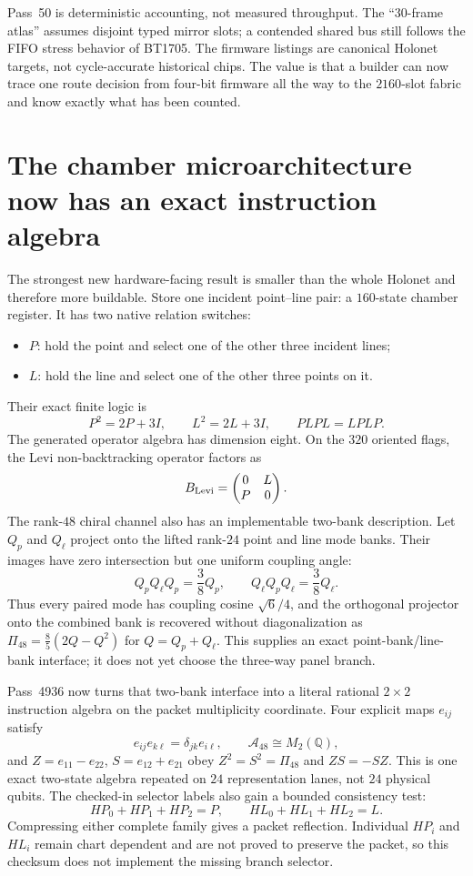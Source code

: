 \documentclass[11pt]{article}
\begin{document}
\begin{honestbox}
Pass~50 is deterministic accounting, not measured throughput.  The
``30-frame atlas'' assumes disjoint typed mirror slots; a contended shared bus
still follows the FIFO stress behavior of BT1705.  The firmware listings are
canonical Holonet targets, not cycle-accurate historical chips.  The value is
that a builder can now trace one route decision from four-bit firmware all the
way to the \(2160\)-slot fabric and know exactly what has been counted.
\end{honestbox}

\section{The chamber microarchitecture now has an exact instruction algebra}

The strongest new hardware-facing result is smaller than the whole Holonet and therefore
more buildable. Store one incident point--line pair: a $160$-state chamber register. It has
two native relation switches:

\begin{itemize}[leftmargin=1.4em]
\item $P$: hold the point and select one of the other three incident lines;
\item $L$: hold the line and select one of the other three points on it.
\end{itemize}

Their exact finite logic is
\[
P^2=2P+3I,\qquad L^2=2L+3I,\qquad PLPL=LPLP.
\]
The generated operator algebra has dimension eight. On the $320$ oriented flags, the Levi
non-backtracking operator factors as
\[
B_{\rm Levi}=\begin{pmatrix}0&L\\P&0\end{pmatrix}.
\]
The rank-$48$ chiral channel also has an implementable two-bank description. Let
$Q_p$ and $Q_\ell$ project onto the lifted rank-$24$ point and line mode banks.
Their images have zero intersection but one uniform coupling angle:
\[
 Q_pQ_\ell Q_p=\frac38Q_p,\qquad
 Q_\ell Q_pQ_\ell=\frac38Q_\ell.
\]
Thus every paired mode has coupling cosine $\sqrt6/4$, and the orthogonal projector
onto the combined bank is recovered without diagonalization as
$\Pi_{48}=\frac85(2Q-Q^2)$ for $Q=Q_p+Q_\ell$. This supplies an exact
point-bank/line-bank interface; it does not yet choose the three-way panel branch.

Pass~4936 now turns that two-bank interface into a literal rational $2\times2$
instruction algebra on the packet multiplicity coordinate. Four explicit maps
$e_{ij}$ satisfy
\[
 e_{ij}e_{k\ell}=\delta_{jk}e_{i\ell},
 \qquad \mathcal A_{48}\cong M_2(\mathbb Q),
\]
and $Z=e_{11}-e_{22}$, $S=e_{12}+e_{21}$ obey
$Z^2=S^2=\Pi_{48}$ and $ZS=-SZ$. This is one exact two-state algebra repeated
on $24$ representation lanes, not $24$ physical qubits. The checked-in selector
labels also gain a bounded consistency test:
\[
 HP_0+HP_1+HP_2=P,\qquad HL_0+HL_1+HL_2=L.
\]
Compressing either complete family gives a packet reflection. Individual
$HP_i$ and $HL_i$ remain chart dependent and are not proved to preserve the
packet, so this checksum does not implement the missing branch selector.
\end{document}
